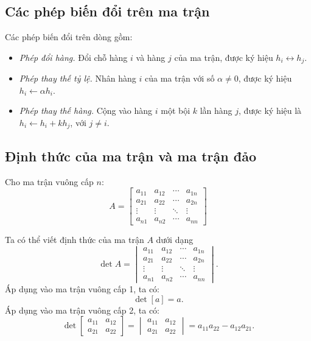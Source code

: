 \documentclass[12pt,a4paper]{report}
\begin{document}
\subsection{Các phép biến đổi trên ma trận}

 Các phép biến đổi trên dòng gồm:
\begin{itemize}
\item \textit{Phép đổi hàng.} Đổi chỗ hàng $i$ và hàng $j$ của ma trận, được ký hiệu $h_i \leftrightarrow h_j$.
\item \textit{Phép thay thế tỷ lệ.} Nhân hàng $i$ của ma trận với số $\alpha \neq 0$, được ký hiệu $h_i \leftarrow \alpha h_i$.
\item \textit{Phép thay thế hàng.} Cộng vào hàng $i$ một bội $k$ lần hàng $j$, được ký hiệu là $h_i \leftarrow h_i + k h_j$, với $j \neq i$.
\end{itemize}


\subsection{ Định thức của ma trận và ma trận đảo}
Cho ma trận vuông cấp $n$:
\begin{equation*}
A =
\begin{bmatrix}
	a_{11} & a_{12} & \cdots & a_{1n} \\
	a_{21} & a_{22} & \cdots & a_{2n} \\
	\vdots & \vdots & \ddots & \vdots \\
	a_{n1} & a_{n2} & \cdots & a_{nn} 
\end{bmatrix}
\end{equation*}

 Ta có thể viết định thức của ma trận $A$ dưới dạng
\begin{equation*}
\det A =
\begin{vmatrix}
	a_{11} & a_{12} & \cdots & a_{1n} \\
	a_{21} & a_{22} & \cdots & a_{2n} \\
	\vdots & \vdots & \ddots & \vdots \\
	a_{n1} & a_{n2} & \cdots & a_{nn} 
\end{vmatrix}.
\end{equation*}
 Áp dụng vào ma trận vuông cấp 1, ta có:
\begin{equation}
\det[a]=a.
\end{equation}
Áp dụng vào ma trận vuông cấp 2, ta có:
\begin{equation}
\det \begin{bmatrix}
a_{11} & a_{12} \\
a_{21} & a_{22}
\end{bmatrix} = \begin{vmatrix}
a_{11} & a_{12} \\
a_{21} & a_{22}
\end{vmatrix} = a_{11}a_{22} - a_{12}a_{21}.
\end{equation}
\end{document}
